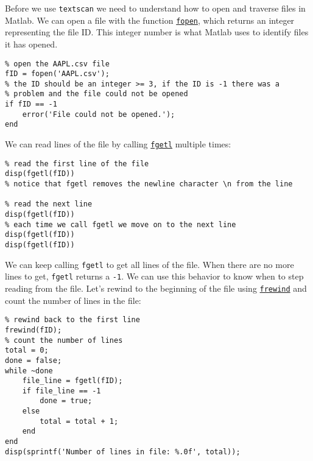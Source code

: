 \documentclass[12pt, a4paper]{article}
\begin{document}
Before we use \texttt{textscan} we need to understand how to open and traverse files in Matlab.
We can open a file with the function \href{https://www.mathworks.com/help/matlab/ref/fopen.html}{\texttt{fopen}}, which returns an integer representing the file ID.
This integer number is what Matlab uses to identify files it has opened.
\lstset{language=matlab,label= ,caption= ,captionpos=b,firstnumber=1,numbers=left,style=Matlab-editor}
\begin{lstlisting}
% open the AAPL.csv file
fID = fopen('AAPL.csv');
% the ID should be an integer >= 3, if the ID is -1 there was a
% problem and the file could not be opened
if fID == -1
    error('File could not be opened.');
end
\end{lstlisting}

We can read lines of the file by calling \href{https://www.mathworks.com/help/matlab/ref/fgetl.html?s\_tid=doc\_ta}{\texttt{fgetl}} multiple times:
\lstset{language=matlab,label= ,caption= ,captionpos=b,firstnumber=1,numbers=left,style=Matlab-editor}
\begin{lstlisting}
% read the first line of the file
disp(fgetl(fID))
% notice that fgetl removes the newline character \n from the line

% read the next line
disp(fgetl(fID))
% each time we call fgetl we move on to the next line
disp(fgetl(fID))
disp(fgetl(fID))
\end{lstlisting}

We can keep calling \texttt{fgetl} to get all lines of the file.
When there are no more lines to get, \texttt{fgetl} returns a \texttt{-1}.
We can use this behavior to know when to step reading from the file.
Let's rewind to the beginning of the file using \href{https://www.mathworks.com/help/matlab/ref/frewind.html}{\texttt{frewind}} and count the number of lines in the file:
\lstset{language=matlab,label= ,caption= ,captionpos=b,firstnumber=1,numbers=left,style=Matlab-editor}
\begin{lstlisting}
% rewind back to the first line
frewind(fID);
% count the number of lines
total = 0;
done = false;
while ~done
    file_line = fgetl(fID);
    if file_line == -1
        done = true;
    else
        total = total + 1;
    end
end
disp(sprintf('Number of lines in file: %.0f', total));
\end{lstlisting}
\end{document}
